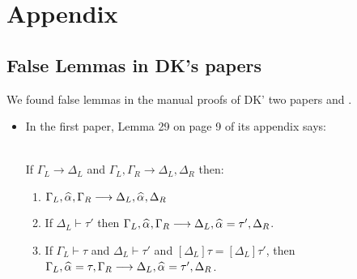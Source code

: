 
\section{Appendix}

\subsection{False Lemmas in DK's papers}
\label{appendix:false_lemmas}

We found false lemmas in the manual proofs of DK' two papers
\cite{dunfield2013complete} and \cite{DunfieldIndexed}.
\begin{itemize}
    \item
        In the first paper, Lemma 29 on page 9 of its appendix says:
        \begin{lemma}~\\
        If $\Gamma_L \longrightarrow \Delta_L$ and
        $\Gamma_L, \Gamma_R \longrightarrow \Delta_L, \Delta_R$ then:
        \begin{enumerate}
            \item $\Gamma_L,\al,\Gamma_R \longrightarrow \Delta_L, \al, \Delta_R$
            \item If $\Delta_L \vdash \tau'$ then
                $\Gamma_L,\al,\Gamma_R \longrightarrow \Delta_L, \al = \tau', \Delta_R$.
            \item If $\Gamma_L \vdash \tau$ and $\Delta_L \vdash \tau'$ and
                $[\Delta_L]\tau = [\Delta_L]\tau'$, then
                $\Gamma_L, \al = \tau, \Gamma_R \longrightarrow \Delta_L, \al = \tau', \Delta_R$.
        \end{enumerate}
        \end{lemma}


\end{itemize}
